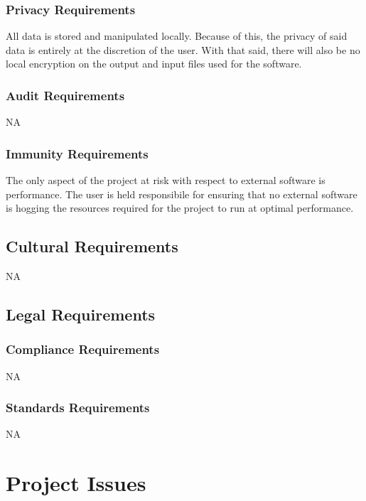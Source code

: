 \documentclass[12pt]{article}
\begin{document}
\subsubsection{Privacy Requirements}
All data is stored and manipulated locally. Because of this, the privacy of said data is entirely at the discretion of the user. With that said, there will also be no local encryption on the output and input files used for the software.\\

\subsubsection{Audit Requirements}
NA\\

\subsubsection{Immunity Requirements}
The only aspect of the project at risk with respect to external software is performance. The user is held responsibile for ensuring that no external software is hogging the resources required for the project to run at optimal performance.\\

\subsection{Cultural Requirements} %
NA

\subsection{Legal Requirements} %
\subsubsection{Compliance Requirements}
NA
\subsubsection{Standards Requirements}
NA

\section{Project Issues}
\end{document}
